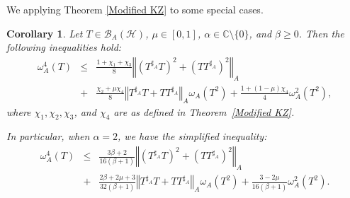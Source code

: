 \documentclass{article}
\newcommand{\normA}[1]{{\left\Vert#1\right\Vert}_{A}}
\newtheorem{corollary}[theorem]{Corollary}
\begin{document}
We applying Theorem \ref{Modified KZ} to some special cases.
\begin{corollary}\label{cor:modified_KZ_special_case}
Let $T \in \mathcal{B}_A(\mathcal{H})$, $\mu \in [0,1]$, $\alpha \in \mathbb{C}\setminus\{0\}$, and $\beta \geq 0$. Then the following inequalities hold:
\begin{eqnarray}\label{eq:general_inequality}
  \omega_A^4(T)  &\leq& \frac{1 + \chi_1 + \chi_3}{8} \normA{(T^{\sharp_A}T)^2 + (TT^{\sharp_A})^2}\\
&+& \frac{\chi_2 + \mu\chi_4}{8} \normA{T^{\sharp_A}T + TT^{\sharp_A}} \omega_A(T^2)+ \frac{1 + (1-\mu)\chi_4}{4} \omega_A^2(T^2),\nonumber
\end{eqnarray}
where $\chi_1, \chi_2, \chi_3$, and $\chi_4$ are as defined in Theorem~\ref{Modified KZ}.

In particular, when $\alpha = 2$, we have the simplified inequality:
\begin{eqnarray}\label{eq:simplified_inequality}
  \omega_A^4(T)  &\leq&\frac{3\beta + 2}{16(\beta + 1)} \normA{(T^{\sharp_A}T)^2 + (TT^{\sharp_A})^2}\\
   &+&\frac{2\beta + 2\mu + 3}{32(\beta + 1)} \normA{T^{\sharp_A}T + TT^{\sharp_A}} \omega_A(T^2)
+ \frac{3 - 2\mu}{16(\beta + 1)} \omega_A^2(T^2).\nonumber
\end{eqnarray}
\end{corollary}
\end{document}
